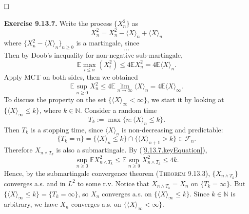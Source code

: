\documentclass[12pt]{extarticle}
\begin{document}
$\hspace{\fill}\square$
\\
\\
\textbf{Exercise 9.13.7.} Write the process $\{X_n^2\}$ as 
\[
X_n^2=X_n^2-\langle X\rangle_n+\langle X\rangle_n
\]
where $\{ X_n^2-\langle X\rangle_n\}_{n\geq 0}$ is a martingale, since
\[
...
\]
Then by Doob's inequality for non-negative sub-martingale,
\[
\mathbb{E}\max_{i\leq n}(X_i^2)\leq 4\mathbb{E}X_n^2=4\mathbb{E}\langle X\rangle_n.
\]
Apply MCT on both sides, then we obtained
\begin{equation}
\mathbb{E}\sup_{n\geq 0}X_n^2\leq 4\mathbb{E}\lim_{n\rightarrow\infty}\langle X\rangle_n=4\mathbb{E}\langle X\rangle_\infty.
\label{9.13.7.keyEquation}
\end{equation}
To discuss the property on the set $\{\langle X\rangle_\infty<\infty\}$, we start it by looking at $\{\langle X\rangle_\infty\leq k\}$, where $k\in\mathbb{N}$. Consider a random time
\[
T_k:=\max\{n:\langle X\rangle_n\leq k\}.
\]
Then $T_k$ is a stopping time, since $\langle X\rangle_n$ is non-decreasing and predictable:
\[
\{T_k=n\}=\{\langle X\rangle_n\leq k\}\cap\{\langle X\rangle_{n+1}>k\}\in\mathcal{F}_n.
\]
Therefore $X_{n\wedge T_k}$ is also a submartingale. By (\ref{9.13.7.keyEquation}),
\[
\sup_{n\geq 0}\mathbb{E}X_{n\wedge T_k}^2\leq
\mathbb{E}\sup_{n\geq 0}X_{n\wedge T_k}^2\leq 4k.
\]
Hence, by the submartingale convergence theorem (\textsc{Theorem 9.13.3}), $\{X_{n\wedge T_k}\}$ converges a.s. and in $L^2$ to some r.v. Notice that $X_{n\wedge T_k}=X_n$ on $\{T_k=\infty\}$. But $\{\langle X\rangle_\infty\leq k\}=\{T_k=\infty\}$, so $X_n$ converges a.s. on $\{\langle X\rangle	_\infty\leq k\}$. Since $k\in\mathbb{N}$ is arbitrary, we have $X_n$ converges a.s. on $\{\langle X\rangle_\infty<\infty\}$.
\end{document}
